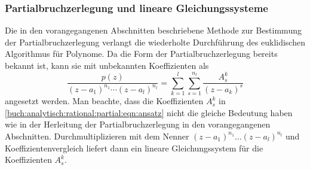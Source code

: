 \subsubsection{Partialbruchzerlegung und lineare Gleichungssysteme}
Die in den vorangegangenen Abschnitten beschriebene Methode zur
Bestimmung der Partialbruchzerlegung verlangt die wiederholte
Durchführung des euklidischen Algorithmus für Polynome.
Da die Form der Partialbruchzerlegung bereits bekannt ist,
kann sie mit unbekannten Koeffizienten als
\begin{equation}
\frac{p(z)}{(z-a_1)^{n_1}\cdots(z-a_l)^{n_l}}
=
\sum_{k=1}^l
\sum_{s=1}^{n_l}
\frac{A^k_s}{(z-a_k)^s}
\label{buch:analytisch:rational:partial:eqn:ansatz}
\end{equation}
angesetzt werden.
Man beachte, dass die Koeffizienten $A^k_s$ in
\eqref{buch:analytisch:rational:partial:eqn:ansatz} nicht
die gleiche Bedeutung haben wie in der Herleitung der
Partialbruchzerlegung in den vorangegangenen Abschnitten.
Durchmultiplizieren mit dem Nenner $(z-a_1)^{n_1}\dots (z-a_l)^{n_l}$
und Koeffizientenvergleich liefert dann ein lineare Gleichungssystem
für die Koeffizienten $A^k_s$.

